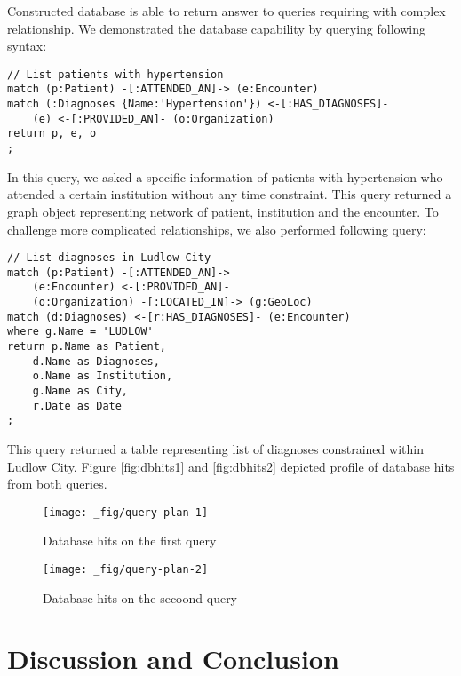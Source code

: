 \documentclass[]{article}
\begin{document}
Constructed database is able to return answer to queries requiring with
complex relationship. We demonstrated the database capability by
querying following syntax:

\begin{verbatim}
// List patients with hypertension
match (p:Patient) -[:ATTENDED_AN]-> (e:Encounter)
match (:Diagnoses {Name:'Hypertension'}) <-[:HAS_DIAGNOSES]-
    (e) <-[:PROVIDED_AN]- (o:Organization)
return p, e, o
;
\end{verbatim}

In this query, we asked a specific information of patients with
hypertension who attended a certain institution without any time
constraint. This query returned a graph object representing network of
patient, institution and the encounter. To challenge more complicated
relationships, we also performed following query:

\begin{verbatim}
// List diagnoses in Ludlow City
match (p:Patient) -[:ATTENDED_AN]->
    (e:Encounter) <-[:PROVIDED_AN]- 
    (o:Organization) -[:LOCATED_IN]-> (g:GeoLoc)
match (d:Diagnoses) <-[r:HAS_DIAGNOSES]- (e:Encounter)
where g.Name = 'LUDLOW'
return p.Name as Patient,
    d.Name as Diagnoses,
    o.Name as Institution,
    g.Name as City,
    r.Date as Date 
;
\end{verbatim}

This query returned a table representing list of diagnoses constrained
within Ludlow City. Figure \ref{fig:dbhits1} and \ref{fig:dbhits2}
depicted profile of database hits from both queries.

\begin{figure}

{\centering \texttt{[image: \_fig/query-plan-1]} 

}

\caption{\label{fig:dbhits1} Database hits on the first query}\label{fig:fig:dbhits1}
\end{figure}

\begin{figure}

{\centering \texttt{[image: \_fig/query-plan-2]} 

}

\caption{\label{fig:dbhits2} Database hits on the secoond query}\label{fig:fig:dbhits2}
\end{figure}

\hypertarget{discussion-and-conclusion}{%
\section{Discussion and Conclusion}\label{discussion-and-conclusion}}
\end{document}
